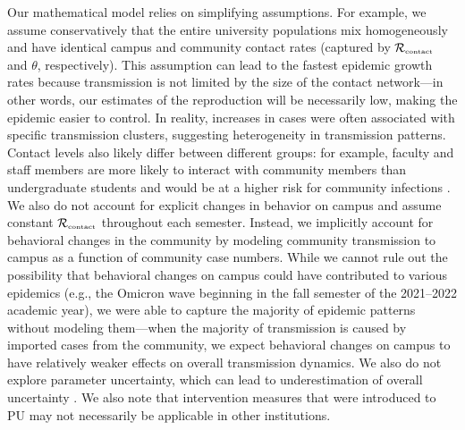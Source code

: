 \documentclass[12pt]{article}
\newcommand{\Rx}[1]{\ensuremath{{\mathcal R}_{#1}}}
\newcommand{\Rc}{\Rx{\textrm{\tiny{contact}}}}
\begin{document}
Our mathematical model relies on simplifying assumptions.
For example, we assume conservatively that the entire university populations mix homogeneously and have identical campus and community contact rates (captured by $\Rc$ and $\theta$, respectively).
This assumption can lead to the fastest epidemic growth rates because transmission is not limited by the size of the contact network---in other words, our estimates of the reproduction will be necessarily low, making the epidemic easier to control.
In reality, increases in cases were often associated with specific transmission clusters, suggesting heterogeneity in transmission patterns.
Contact levels also likely differ between different groups:
for example, faculty and staff members are more likely to interact with community members than undergraduate students and would be at a higher risk for community infections \citep{frazier2022modeling}.
We also do not account for explicit changes in behavior on campus and assume constant $\Rc$ throughout each semester.
Instead, we implicitly account for behavioral changes in the community by modeling community transmission to campus as a function of community case numbers.
While we cannot rule out the possibility that behavioral changes on campus could have contributed to various epidemics (e.g., the Omicron wave beginning in the fall semester of the 2021--2022 academic year), we were able to capture the majority of epidemic patterns without modeling them---when the majority of transmission is caused by imported cases from the community, we expect behavioral changes on campus to have relatively weaker effects on overall transmission dynamics.
We also do not explore parameter uncertainty, which can lead to underestimation of overall uncertainty \citep{elderd2006uncertainty}. 
We also note that intervention measures that were introduced to PU may not necessarily be applicable in other institutions.
\end{document}

